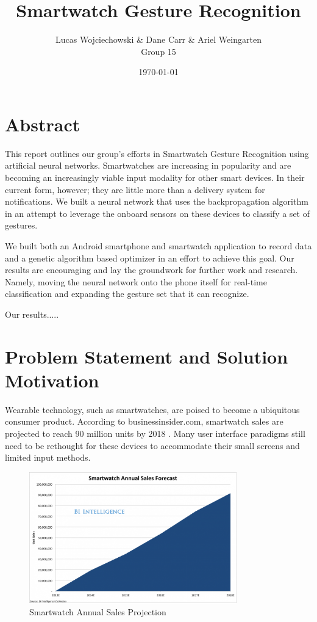 \documentclass{report}
\title{Smartwatch Gesture Recognition}
\date{\today}
\author{
  Lucas Wojciechowski \& Dane Carr \& Ariel Weingarten \\
  Group 15
}
\begin{document}
\maketitle


\chapter{Abstract}

This report outlines our group's efforts in Smartwatch Gesture Recognition using artificial neural networks. Smartwatches are increasing in popularity and are becoming an increasingly viable input modality for other smart devices. In their current form, however; they are little more than a delivery system for notifications. We built a neural network that uses the backpropagation  algorithm in an attempt to leverage the onboard sensors on these devices to classify a set of gestures.

We built both an Android smartphone and smartwatch application to record data and a genetic algorithm based optimizer in an effort to achieve this goal. Our results are encouraging and lay the groundwork for further work and research. Namely, moving the neural network onto the phone itself for real-time classification and expanding the gesture set that it can recognize.

Our results.....

\chapter{Problem Statement and Solution Motivation}
Wearable technology, such as smartwatches, are poised to become a ubiquitous consumer product. According to businessinsider.com, smartwatch sales are projected to reach 90 million units by 2018 \cite{BusinessInsider}. Many user interface paradigms still need to be rethought for these devices to accommodate their small screens and limited input methods.

\begin{figure}[ht!]
  \label{smartwatch}
  \centering
  \includegraphics[width=90mm]{smartwatch.png}
  \caption{Smartwatch Annual Sales Projection \label{overflow}}
\end{figure}
\end{document}
